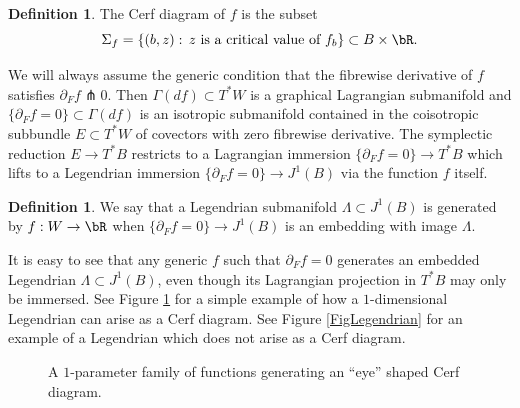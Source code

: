 \documentclass[JEP,XML,SOM,Unicode,NoFloatCountersInSection]{cedram}
\theoremstyle{plain}
\theoremstyle{definition}
\newtheorem{definition}[theorem]{Definition}
\begin{document}
\begin{definition}
The Cerf diagram of $f$ is the subset
\[
\Sigma_f=\{ (b,z) : \, \text{$z$ is a critical value of $f_b$} \} \subset B \times \bR.
\]
\end{definition}

We will always assume the generic condition that the fibrewise derivative of $f$ satisfies $\partial_F f \pitchfork 0 $. Then $\Gamma(df) \subset T^*W$ is a graphical Lagrangian submanifold and $ \{ \partial_F f = 0 \} \subset \Gamma(df)$ is an isotropic submanifold contained in the coisotropic subbundle $E \subset T^*W$ of covectors with zero fibrewise derivative. The symplectic reduction $E \to T^*B$ restricts to a Lagrangian immersion $\{ \partial_F f= 0 \} \to T^*B$ which lifts to a Legendrian immersion $\{ \partial_Ff = 0 \} \to J^1(B)$ via the function $f$ itself.

\begin{definition} We say that a Legendrian submanifold $\Lambda \subset J^1(B)$ is generated by $f:W \to \bR$ when $\{ \partial_F f = 0 \} \to J^1 (B)$ is an embedding with image $\Lambda$.
\end{definition}

It is easy to see that any generic $f$ such that $\partial_F f = 0$ generates an embedded Legendrian $\Lambda \subset J^1(B)$, even though its Lagrangian projection in $T^*B$ may only be immersed. See Figure \ref{Fig: simple Legendrian} for a simple example of how a $1$-dimensional Legendrian can arise as a Cerf diagram. See Figure \ref{FigLegendrian} for an example of a Legendrian which does not arise as a Cerf diagram.
\begin{figure}[htbp]
\begin{center}
\caption{\smaller A $1$-parameter family of functions generating an ``eye'' shaped Cerf diagram.}
\label{Fig: simple Legendrian}
\end{center}
\end{figure}
\end{document}
